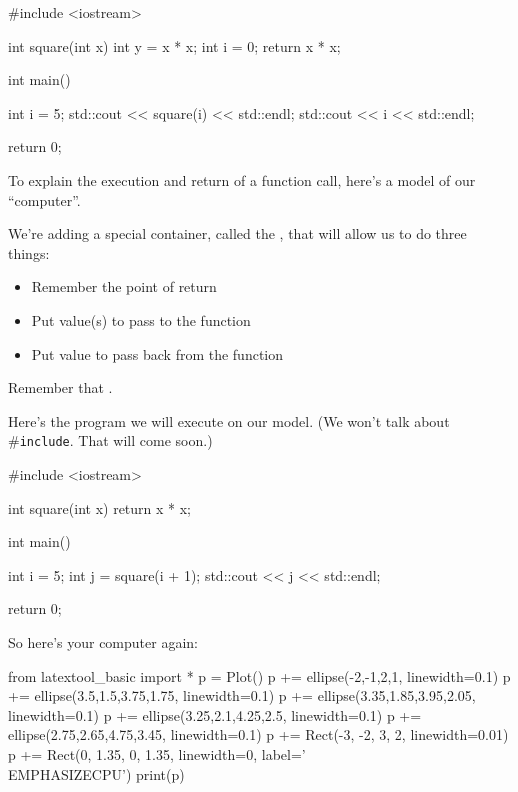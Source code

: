 \begin{consolethree}[escapeinside=||]
#include <iostream>

int square(int x)
{
    int y = x * x;
    int i = 0;
    return x * x;
}

int main()
{
    int i = 5;
    std::cout << square(i) << std::endl;
    std::cout << i << std::endl;

    return 0;
}
\end{consolethree}


\newpage{}

To explain the execution and return of a function call, here's a model of our ``computer''.

We're adding a special container, called the , that will allow us to do three things:

\begin{itemize}
\item Remember the point of return
\item Put value(s) to pass to the function
\item Put value to pass back from the function
\end{itemize}

Remember that .

Here's the program we will execute on our model. (We won't talk about \#\verb!include!. That will come soon.)

\begin{consolethree}[escapeinside=||]
#include <iostream>

int square(int x)
{
    return x * x;
}

int main()
{
    int i = 5;
    int j = square(i + 1);
    std::cout << j << std::endl;

    return 0;
}
\end{consolethree}
So here's your computer again:
\begin{python}
from latextool_basic import *
p = Plot()
p += ellipse(-2,-1,2,1, linewidth=0.1)
p += ellipse(3.5,1.5,3.75,1.75, linewidth=0.1)
p += ellipse(3.35,1.85,3.95,2.05, linewidth=0.1)
p += ellipse(3.25,2.1,4.25,2.5, linewidth=0.1)
p += ellipse(2.75,2.65,4.75,3.45, linewidth=0.1)
p += Rect(-3, -2, 3, 2, linewidth=0.01)
p += Rect(0, 1.35, 0, 1.35, linewidth=0, label='\\EMPHASIZE{CPU}')
print(p)
\end{python}

\newpage

